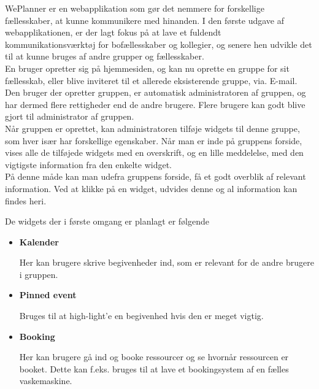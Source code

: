 \noindent WePlanner er en webapplikation som gør det nemmere for forskellige fællesskaber, at kunne kommunikere med hinanden. I den første udgave af webapplikationen, er der lagt fokus på at lave et fuldendt kommunikationsværktøj for bofællesskaber og kollegier, og senere hen udvikle det til at kunne bruges af andre grupper og fællesskaber.\\

\noindent En bruger opretter sig på hjemmesiden, og kan nu oprette en gruppe for sit fællesskab, eller blive inviteret til et allerede eksisterende gruppe, via. E-mail. Den bruger der opretter gruppen, er automatisk administratoren af gruppen, og har dermed flere rettigheder end de andre brugere. Flere brugere kan godt blive gjort til administrator af gruppen. \\

\noindent Når gruppen er oprettet, kan administratoren tilføje widgets til denne gruppe, som hver især har forskellige egenskaber. Når man er inde på gruppens forside, vises alle de tilføjede widgets med en overskrift, og en lille meddelelse, med den vigtigste information fra den enkelte widget.\\
På denne måde kan man udefra gruppens forside, få et godt overblik af relevant information. Ved at klikke på en widget, udvides denne og al information kan findes heri.

\noindent De widgets der i første omgang er planlagt er følgende

\begin{itemize}
\item  \textbf{Kalender}

Her kan brugere skrive begivenheder ind, som er relevant for de andre brugere i gruppen.
\end{itemize}

\begin{itemize}
\item  \textbf{Pinned event}

Bruges til at high-light'e en begivenhed hvis den er meget vigtig.
\end{itemize}

\begin{itemize}
\item  \textbf{Booking}

Her kan brugere gå ind og booke ressourcer og se hvornår ressourcen er booket. Dette kan f.eks. bruges til at lave et bookingsystem af en fælles vaskemaskine.
\end{itemize}

